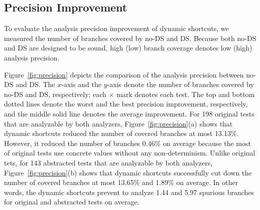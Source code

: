 \subsection{Precision Improvement}

To evaluate the analysis precision improvement of dynamic shortcuts,
we measured the number of branches covered by no-DS and DS.
Because both no-DS and DS are designed to be sound,
high (low) branch coverage denotes low (high) analysis precision.

Figure~\ref{fig:precision} depicts the comparison of the analysis
precision between no-DS and DS.  The $x$-axis and the $y$-axis denote
the number of branches covered by no-DS and DS, respectively;
each $\times$ mark denotes each test.  The top and bottom dotted lines
denote the worst and the best precision improvement, respectively, and
the middle solid line denotes the average improvement.
For 198 original tests that are analyzable by both analyzers,
Figure~\ref{fig:precision}(a) shows that dynamic shortcuts
reduced the number of covered branches at most 13.13\%. However, it reduced
the number of branches 0.46\% on average because the most of original tests
use concrete values without any non-determinism. Unlike original tets, for 143
abstracted tests that are analyzable by both analyzers,
Figure~\ref{fig:precision}(b) shows that dynamic shortcuts successfully cut down
the number of covered branches at most 13.65\% and 1.89\% on average.  In other
words, the dynamic shortcuts prevent to analyze 1.44 and 5.97 spurious branches
for original and abstracted tests on average.


